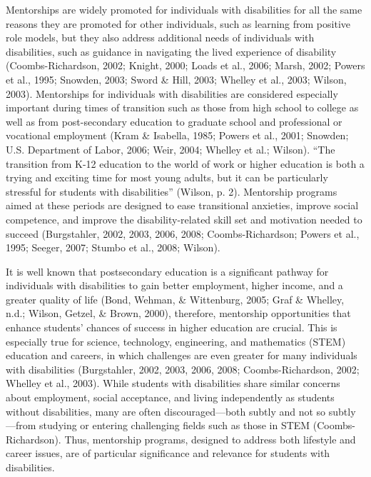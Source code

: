 \documentclass[11.5pt]{sig-alternate} %
\begin{document}
\begin{large}
Mentorships are widely promoted for individuals with disabilities for all the same reasons they are promoted for other individuals, such as learning from positive role models, but they also address additional needs of individuals with disabilities, such as guidance in navigating the lived experience of disability (Coombs-Richardson, 2002; Knight, 2000; Loads et al., 2006; Marsh, 2002; Powers et al., 1995; Snowden, 2003; Sword \& Hill, 2003; Whelley et al., 2003; Wilson, 2003). Mentorships for individuals with disabilities are considered especially important during times of transition such as those from high school to college as well as from post-secondary education to graduate school and professional or vocational employment (Kram \& Isabella, 1985; Powers et al., 2001; Snowden; U.S. Department of Labor, 2006; Weir, 2004; Whelley et al.; Wilson). “The transition from K-12 education to the world of work or higher education is both a trying and exciting time for most young adults, but it can be particularly stressful for students with disabilities” (Wilson, p. 2). Mentorship programs aimed at these periods are designed to ease transitional anxieties, improve social competence, and improve the disability-related skill set and motivation needed to succeed (Burgstahler, 2002, 2003, 2006, 2008; Coombs-Richardson; Powers et al., 1995; Seeger, 2007; Stumbo et al., 2008; Wilson).

It is well known that postsecondary education is a significant pathway for individuals with disabilities to gain better employment, higher income, and a greater quality of life (Bond, Wehman, \& Wittenburg, 2005; Graf \& Whelley, n.d.; Wilson, Getzel, \& Brown, 2000), therefore, mentorship opportunities that enhance students' chances of success in higher education are crucial. This is especially true for science, technology, engineering, and mathematics (STEM) education and careers, in which challenges are even greater for many individuals with disabilities (Burgstahler, 2002, 2003, 2006, 2008; Coombs-Richardson, 2002; Whelley et al., 2003). While students with disabilities share similar concerns about employment, social acceptance, and living independently as students without disabilities, many are often discouraged—both subtly and not so subtly—from studying or entering challenging fields such as those in STEM (Coombs-Richardson). Thus, mentorship programs, designed to address both lifestyle and career issues, are of particular significance and relevance for students with disabilities.


\end{large}
\end{document}
